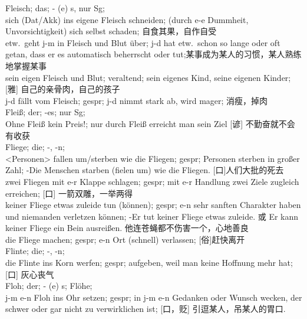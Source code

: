 \noindent
Fleisch; das; \-- (e) s, nur Sg;\\
sich (Dat/Akk) ins eigene Fleisch schneiden; (durch e-e Dummheit, Unvorsichtigkeit) sich selbst schaden; 自食其果，自作自受\\
etw.\ geht j-m in Fleisch und Blut \"uber; j-d hat etw.\ schon so lange oder oft getan, dass er es automatisch beherrscht oder tut;某事成为某人的习惯，某人熟练地掌握某事\\
sein eigen Fleisch und Blut; veraltend; sein eigenes Kind, seine eigenen Kinder; [雅] 自己的亲骨肉，自己的孩子\\
j-d f\"allt vom Fleisch; gespr; j-d nimmt stark ab, wird mager; 消瘦，掉肉\\

\noindent
Flei\ss{}; der; -es; nur Sg; \\
Ohne Flei\ss{} kein Preis!; nur durch Flei\ss{} erreicht man sein Ziel [谚] 不勤奋就不会有收获\\

\noindent
Fliege; die; -, -n; \\
<Personen> fallen um/sterben wie die Fliegen; gespr; Personen sterben in gro\ss{}er Zahl; -Die Menschen starben (fielen um) wie die Fliegen. [口]人们大批的死去\\
zwei Fliegen mit e-r Klappe schlagen; gespr; mit e-r Handlung zwei Ziele zugleich erreichen; [口] 一箭双雕，一举两得\\
keiner Fliege etwas zuleide tun (k\"onnen); gespr; e-n sehr sanften Charakter haben und niemanden verletzen k\"onnen; -Er tut keiner Fliege etwas zuleide. 或 Er kann keiner Fliege ein Bein ausrei\ss{}en. 他连苍蝇都不伤害一个，心地善良\\
die Fliege machen; gespr; e-n Ort (schnell) verlassen; [俗]赶快离开\\

\noindent
Flinte; die; -, -n;\\
die Flinte ins Korn werfen; gespr; aufgeben, weil man keine Hoffnung mehr hat; [口] 灰心丧气\\

\noindent
Floh; der; \-- (e) s; Fl\"ohe;\\
j-m e-n Floh ins Ohr setzen; gespr; in j-m e-n Gedanken oder Wunsch wecken, der schwer oder gar nicht zu verwirklichen ist; [口，贬] 引逗某人，吊某人的胃口.\\

\noindent


